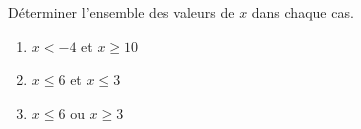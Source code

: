 
Déterminer l'ensemble des valeurs de $x$ dans chaque cas.
\begin{enumerate}
\item $x < -4$ et $x \geq 10$
\item $x \leq 6$ et $x \leq 3$
\item $x \leq 6$ ou $x \geq 3$
\end{enumerate}